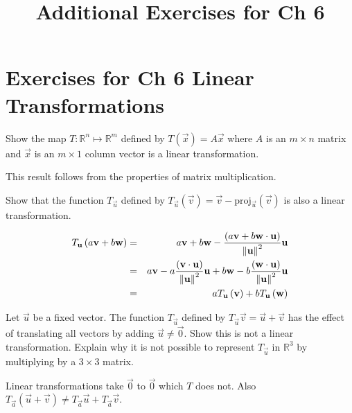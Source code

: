 \documentclass{ximera}
\title{Additional Exercises for Ch 6} \license{CC BY-NC-SA 4.0}
\begin{document}
\begin{abstract}
\end{abstract}
\maketitle

\section*{Exercises for Ch 6 Linear Transformations}





\begin{problem}\label{prb:6.1} Show the map $T:\mathbb{R}^{n}\mapsto \mathbb{R}^{m}$ defined by
$T\left( \vec{x} \right) =A\vec{x}$ where $A$ is an $m\times n$ matrix
and $\vec{x}$ is an $m\times 1$ column vector is a linear transformation.
\begin{hint}
This result follows from the properties of matrix multiplication.
\end{hint}
\end{problem}

\begin{problem}\label{prb:6.2} Show that the function $T_{\vec{u}}$ defined by $T_{\vec{u}}
\left( \vec{v}\right) = \vec{v}-\mbox{proj}_{\vec{u}}\left(
\vec{v}\right) $ is also a linear transformation.
\begin{hint}
\begin{eqnarray*}
T_{\mathbf{u}}\left( a\mathbf{v}+b\mathbf{w}\right) &=&a\mathbf{v}+b\mathbf{w}-\frac{\left( a\mathbf{v}+b\mathbf{w}\cdot \mathbf{u}\right) }{\left\lVert \mathbf{u}
\right\rVert ^{2}}\mathbf{u} \\
&=&a\mathbf{v}-a\frac{\left( \mathbf{v}\cdot \mathbf{u}\right) }{\left\lVert \mathbf{u} \right\rVert ^{2}}\mathbf{u}+b\mathbf{w}-b\frac{\left( \mathbf{w}\cdot \mathbf{u}
\right) }{\left\lVert \mathbf{u}\right\rVert ^{2}}\mathbf{u} \\
&=&aT_{\mathbf{u}}\left( \mathbf{v}\right) +bT_{\mathbf{u}}\left( \mathbf{w}
\right)
\end{eqnarray*}
\end{hint}
\end{problem}

\begin{problem}\label{prb:6.3} Let $\vec{u}$ be a fixed vector. The function
$T_{\vec{u}}$ defined by $T_{\vec{u}}\vec{v}=\vec{u}+\vec{v}$ has the effect of
translating all vectors by adding $\vec{u}\neq \vec{0}$. Show this is not a
linear transformation. Explain why it is not possible to represent
$T_{\vec{u}}$ in $\mathbb{R}^{3}$ by multiplying by a $3\times 3$ matrix.
\begin{hint}
Linear
transformations take $\vec{0}$ to $\vec{0}$ which $T$ does not. Also $T_{\vec{a}}\left( \vec{u}+\vec{v}\right) \neq T_{\vec{a}}\vec{u}+T_{\vec{a}}
\vec{v}.$
\end{hint}
\end{problem}
\end{document}
